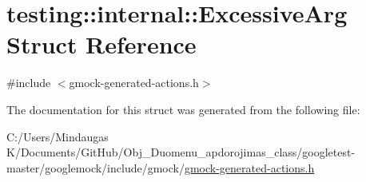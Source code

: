 \hypertarget{structtesting_1_1internal_1_1_excessive_arg}{}\section{testing\+::internal\+::Excessive\+Arg Struct Reference}
\label{structtesting_1_1internal_1_1_excessive_arg}


{\ttfamily \#include $<$gmock-\/generated-\/actions.\+h$>$}



The documentation for this struct was generated from the following file\+:\begin{DoxyCompactItemize}
\item 
C\+:/\+Users/\+Mindaugas K/\+Documents/\+Git\+Hub/\+Obj\+\_\+\+Duomenu\+\_\+apdorojimas\+\_\+class/googletest-\/master/googlemock/include/gmock/\mbox{\hyperlink{googletest-master_2googlemock_2include_2gmock_2gmock-generated-actions_8h}{gmock-\/generated-\/actions.\+h}}\end{DoxyCompactItemize}

